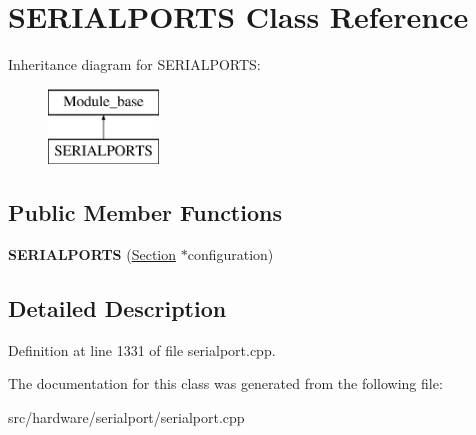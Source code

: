 \hypertarget{classSERIALPORTS}{\section{S\-E\-R\-I\-A\-L\-P\-O\-R\-T\-S Class Reference}
\label{classSERIALPORTS}
}
Inheritance diagram for S\-E\-R\-I\-A\-L\-P\-O\-R\-T\-S\-:\begin{figure}[H]
\begin{center}
\leavevmode
\includegraphics[height=2.000000cm]{classSERIALPORTS}
\end{center}
\end{figure}
\subsection*{Public Member Functions}
\begin{DoxyCompactItemize}
\item 
\hypertarget{classSERIALPORTS_a36570726a1e10f60d8d7be830141f465}{{\bfseries S\-E\-R\-I\-A\-L\-P\-O\-R\-T\-S} (\hyperlink{classSection}{Section} $\ast$configuration)}\label{classSERIALPORTS_a36570726a1e10f60d8d7be830141f465}

\end{DoxyCompactItemize}


\subsection{Detailed Description}


Definition at line 1331 of file serialport.\-cpp.



The documentation for this class was generated from the following file\-:\begin{DoxyCompactItemize}
\item 
src/hardware/serialport/serialport.\-cpp\end{DoxyCompactItemize}
